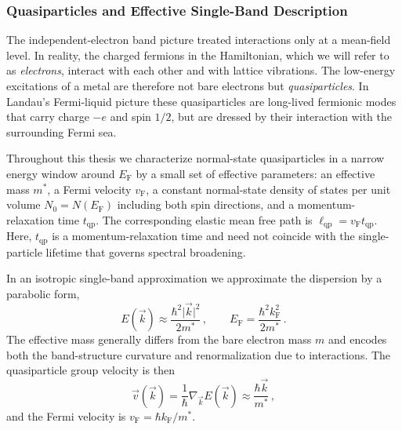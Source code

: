         \subsubsection*{Quasiparticles and Effective Single-Band Description}

            The independent-electron band picture treated interactions only at a mean-field level. In reality, the charged fermions in the Hamiltonian, which we will refer to as \emph{electrons}, interact with each other and with lattice vibrations. The low-energy excitations of a metal are therefore not bare electrons but \emph{quasiparticles}. In Landau's Fermi-liquid picture these quasiparticles are long-lived fermionic modes that carry charge $-e$ and spin $1/2$, but are dressed by their interaction with the surrounding Fermi sea. \cite{landau_theory_1956}

            Throughout this thesis we characterize normal-state quasiparticles in a narrow energy window around $E_\mathrm{F}$ by a small set of effective parameters: an effective mass $m^\ast$, a Fermi velocity $v_\mathrm{F}$, a constant normal-state density of states per unit volume $N_0 = N(E_\mathrm{F})$ including both spin directions, and a momentum-relaxation time $t_\mathrm{qp}$. The corresponding elastic mean free path is $\ell_\mathrm{qp}= v_\mathrm{F} t_\mathrm{qp}$. Here, $t_\mathrm{qp}$ is a momentum-relaxation time and need not coincide with the single-particle lifetime that governs spectral broadening.

            In an isotropic single-band approximation we approximate the dispersion by a parabolic form,
            \begin{equation}
                E(\vec{k}) \approx \frac{\hbar^2 \lvert \vec{k} \rvert^2}{2m^\ast}\,,
                \qquad
                E_\mathrm{F} = \frac{\hbar^2 k_\mathrm{F}^2}{2m^\ast}\,.
                \label{eq:micro:parabolic}
            \end{equation}
            The effective mass generally differs from the bare electron mass $m$ and encodes both the band-structure curvature and renormalization due to interactions. The quasiparticle group velocity is then
            \begin{equation}
                \vec{v}(\vec{k})
                = \frac{1}{\hbar} \nabla_{\vec{k}} E(\vec{k})
                \approx \frac{\hbar\vec{k}}{m^\ast}\,,
                \label{eq:basics:quasiparticle-velocity}
            \end{equation}
            and the Fermi velocity is $v_\mathrm{F} = \hbar k_\mathrm{F} / m^\ast$.

